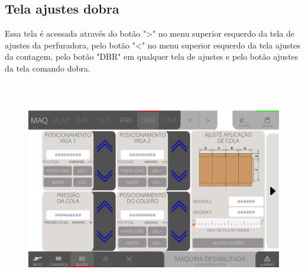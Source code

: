 \thispagestyle{fancy}
\vspace*{40 pt}
\subsection{Tela ajustes dobra}\label{miniTelaAjustesDobra}
Essa tela é acessada através do botão "\textgreater" no menu superior esquerdo da tela de ajustes da perfuradora, pelo botão "\textless{}" no menu superior esquerdo
da tela ajustes da contagem, pelo botão "DBR" em qualquer tela de ajustes e pelo botão ajustes da tela comando dobra.
\vspace*{\fill}
\begin{figure}[h]
  \centering
  \includegraphics[width=576px,height=360px]{src/imagesFlexo/07-fold/settings/e-Tela-Principal.png}
\end{figure}
\vspace*{\fill}

\newpage
\thispagestyle{fancy}
\vspace*{40 pt}

